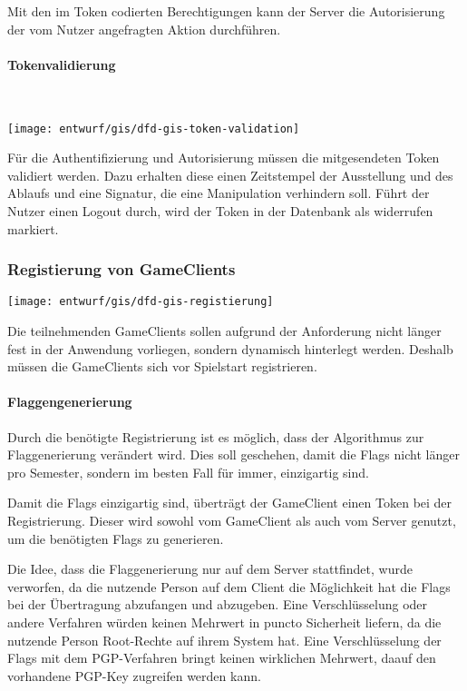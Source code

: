 Mit den im Token codierten Berechtigungen kann der Server die Autorisierung der vom Nutzer angefragten Aktion durchführen.

\paragraph{Tokenvalidierung}
\mbox{}\\ %

\begin{center}
	\texttt{[image: entwurf/gis/dfd-gis-token-validation]}
\end{center}

Für die Authentifizierung und Autorisierung müssen die mitgesendeten Token validiert werden.
Dazu erhalten diese einen Zeitstempel der Ausstellung und des Ablaufs und eine Signatur, die eine Manipulation verhindern soll. Führt der Nutzer einen Logout durch, wird der Token in der Datenbank als widerrufen markiert. 

\subsubsection{Registierung von GameClients}
\begin{center}
	\texttt{[image: entwurf/gis/dfd-gis-registierung]}
\end{center}

Die teilnehmenden GameClients sollen aufgrund der Anforderung nicht länger fest in der Anwendung vorliegen, sondern dynamisch hinterlegt werden. Deshalb müssen die GameClients sich vor Spielstart registrieren.

\paragraph{Flaggengenerierung}
Durch die benötigte Registrierung ist es möglich, dass der Algorithmus zur Flaggenerierung verändert wird. Dies soll geschehen, damit die Flags nicht länger pro Semester, sondern im besten Fall für immer, einzigartig sind.

Damit die Flags einzigartig sind, überträgt der GameClient einen Token bei der Registrierung. Dieser wird sowohl vom GameClient als auch vom Server genutzt, um die benötigten Flags zu generieren.

Die Idee, dass die Flaggenerierung nur auf dem Server stattfindet, wurde verworfen, da die nutzende Person auf dem Client die Möglichkeit hat die Flags bei der Übertragung abzufangen und abzugeben. Eine Verschlüsselung oder andere Verfahren würden keinen Mehrwert in puncto Sicherheit liefern, da die nutzende Person Root-Rechte auf ihrem System hat. Eine Verschlüsselung der Flags mit dem PGP-Verfahren bringt keinen wirklichen Mehrwert, daauf den vorhandene PGP-Key zugreifen werden kann. 

